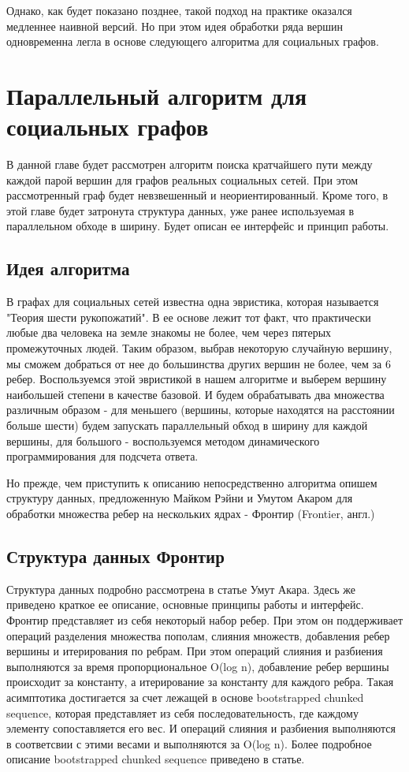 Однако, как будет показано позднее, такой подход на практике оказался медленнее наивной версий. Но при этом идея обработки ряда вершин одновременна легла в основе следующего алгоритма для социальных графов. 
\FloatBarrier
\section{Параллельный алгоритм для социальных графов}
В данной главе будет рассмотрен алгоритм поиска кратчайшего пути между каждой парой вершин для графов реальных социальных сетей. При этом рассмотренный граф будет невзвешенный и неориентированный. Кроме того, в этой главе будет затронута структура данных, уже ранее используемая в параллельном обходе в ширину. Будет описан ее интерфейс и принцип работы. 

\FloatBarrier
\subsection{Идея алгоритма}
В графах для социальных сетей известна одна эвристика, которая называется "Теория шести рукопожатий". В ее основе лежит тот факт, что практически любые два человека на земле знакомы не более, чем через пятерых промежуточных людей. Таким образом, выбрав некоторую случайную вершину, мы сможем добраться от нее до большинства других вершин не более, чем за 6 ребер. Воспользуемся этой эвристикой в нашем алгоритме и выберем вершину наибольшей степени в качестве базовой. И будем обрабатывать два множества различным образом - для меньшего (вершины, которые находятся на расстоянии больше шести) будем запускать параллельный обход в ширину для каждой вершины, для большого - воспользуемся методом динамического программирования для подсчета ответа. 

Но прежде, чем приступить к описанию непосредственно алгоритма опишем структуру данных, предложенную Майком Рэйни и Умутом Акаром для обработки множества ребер на нескольких ядрах - Фронтир (Frontier, англ.)

\FloatBarrier
\subsection{Структура данных Фронтир}
Структура данных подробно рассмотрена в статье Умут Акара. Здесь же приведено краткое ее описание, основные принципы работы и интерфейс. Фронтир представляет из себя некоторый набор ребер. При этом он поддерживает операций разделения множества пополам, слияния множеств, добавления ребер вершины и итерирования по ребрам. При этом  операций слияния и разбиения выполняются за время пропорциональное O(log n), добавление ребер вершины происходит за константу, а итерирование за константу для каждого ребра. Такая асимптотика достигается за счет лежащей в основе bootstrapped chunked sequence, которая представляет из себя последовательность, где каждому элементу сопоставляется его вес. И операций слияния и разбиения выполняются в соответсвии с этими весами и выполняются за O(log n). Более подробное описание bootstrapped chunked sequence приведено в статье. 

